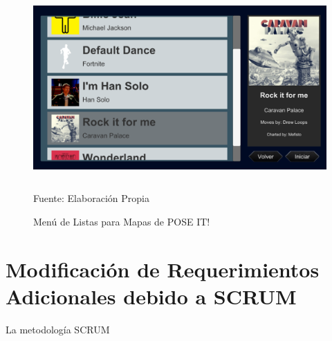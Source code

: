 \begin{figure}[t!]
	\centering
	\includegraphics[width=12cm,height=7cm]{./Images/menudelistas.png}
	\caption{Menú de Listas para Mapas de POSE IT!}
	\footnotesize Fuente: Elaboración Propia
	\label{menulistas}
\end{figure}

\section{Modificación de Requerimientos Adicionales debido a SCRUM}

La metodología SCRUM









